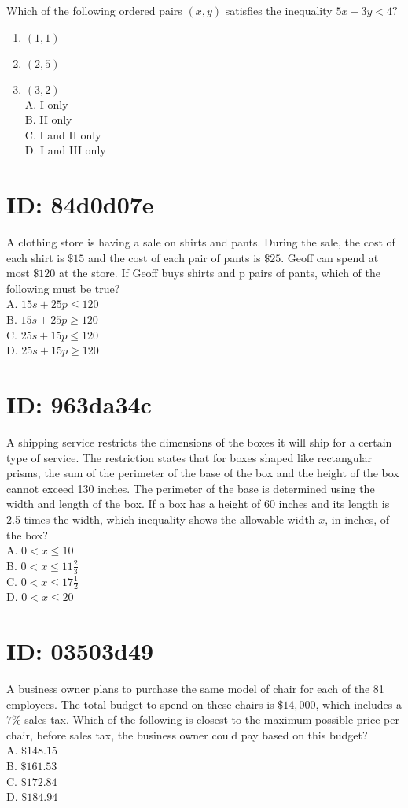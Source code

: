 Which of the following ordered pairs $(x, y)$ satisfies the inequality $5 x-3 y<4 ?$

\begin{enumerate}
  \item $(1,1)$
  \item $(2,5)$
  \item $(3,2)$\\
A. I only\\
B. II only\\
C. I and II only\\
D. I and III only
\end{enumerate}

\section*{ID: 84d0d07e}
A clothing store is having a sale on shirts and pants. During the sale, the cost of each shirt is $\$ 15$ and the cost of each pair of pants is $\$ 25$. Geoff can spend at most $\$ 120$ at the store. If Geoff buys shirts and p pairs of pants, which of the following must be true?\\
A. $15 s+25 p \leq 120$\\
B. $15 s+25 p \geq 120$\\
C. $25 s+15 p \leq 120$\\
D. $25 s+15 p \geq 120$

\section*{ID: 963da34c}
A shipping service restricts the dimensions of the boxes it will ship for a certain type of service. The restriction states that for boxes shaped like rectangular prisms, the sum of the perimeter of the base of the box and the height of the box cannot exceed 130 inches. The perimeter of the base is determined using the width and length of the box. If a box has a height of 60 inches and its length is 2.5 times the width, which inequality shows the allowable width $x$, in inches, of the box?\\
A. $0<x \leq 10$\\
B. $0<x \leq 11 \frac{2}{3}$\\
C. $0<x \leq 17 \frac{1}{2}$\\
D. $0<x \leq 20$

\section*{ID: 03503d49}
A business owner plans to purchase the same model of chair for each of the 81 employees. The total budget to spend on these chairs is $\$ 14,000$, which includes a $7 \%$ sales tax. Which of the following is closest to the maximum possible price per chair, before sales tax, the business owner could pay based on this budget?\\
A. $\$ 148.15$\\
B. $\$ 161.53$\\
C. $\$ 172.84$\\
D. $\$ 184.94$

